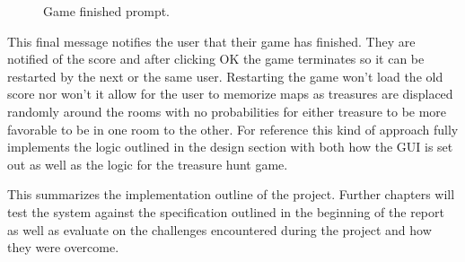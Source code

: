       \begin{figure}[htp]
        \centering
        \caption{Game finished prompt.}
      \end{figure}

      This final message notifies the user that their game has finished. They are notified of the score and after clicking OK the game terminates so it can be restarted by the next or the same user. Restarting the game won't load the old score nor won't it allow for the user to memorize maps as treasures are displaced randomly around the rooms with no probabilities for either treasure to be more favorable to be in one room to the other. For reference this kind of approach fully implements the logic outlined in the design section with both how the GUI is set out as well as the logic for the treasure hunt game.

      This summarizes the implementation outline of the project. Further chapters will test the system against the specification outlined in the beginning of the report as well as evaluate on the challenges encountered during the project and how they were overcome.
